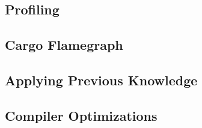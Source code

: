 \subsection{Profiling}
\subsection{Cargo Flamegraph}
\subsection{Applying Previous Knowledge}
\subsection{Compiler Optimizations}
